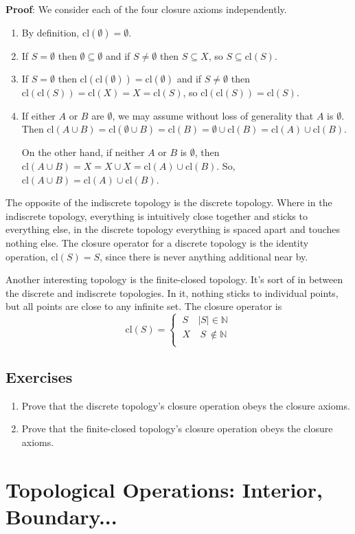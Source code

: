 \documentclass{report}
\newcommand{\cl}{\mathrm{cl}}
\begin{document}
{\bf Proof}: We consider each of the four closure axioms independently.
\begin{enumerate}
\item By definition, $\cl(∅) = ∅$.
\item If $S=∅$ then $∅ ⊆ ∅$ and if $S \neq ∅$ then $S ⊆ X$, so $S ⊆ \cl(S)$.
\item If $S=∅$ then $\cl(\cl(∅)) =  \cl(∅)$ and if $S \neq ∅$ then $\cl(\cl(S)) =  \cl(X) = X = \cl(S)$, so $\cl(\cl(S)) = \cl(S)$.
\item If either $A$ or $B$ are $∅$, we may assume without loss of generality that $A$ is $∅$. Then $\cl(A∪B) = \cl(∅∪B) = \cl(B) = ∅ ∪ \cl(B) = \cl(A) ∪ \cl(B)$. 

On the other hand, if neither $A$ or $B$ is $∅$, then $\cl(A∪B) = X = X∪X = \cl(A) ∪ \cl(B)$. So, $\cl(A∪B) =  \cl(A) ∪ \cl(B)$.
\end{enumerate}

The opposite of the indiscrete topology is the discrete topology. Where in the indiscrete topology, everything is intuitively close together and sticks to everything else, in the discrete topology everything is spaced apart and touches nothing else. The closure operator for a discrete topology is the identity operation, $\cl(S) = S$, since there is never anything additional near by.

Another interesting topology is the finite-closed topology. It's sort of in between the discrete and indiscrete topologies. In it, nothing sticks to individual points, but all points are close to any infinite set. The closure operator is $$\cl(S) = \begin{cases} ~S & |S| ∈ ℕ\\ ~X & ~S~ \not\in ℕ\\ \end{cases} $$

\subsection*{Exercises}

\begin{enumerate}

\item Prove that the discrete topology's closure operation obeys the closure axioms.
\item Prove that the finite-closed topology's closure operation obeys the closure axioms.
\end{enumerate}

\section{Topological Operations: Interior, Boundary...}
\end{document}
